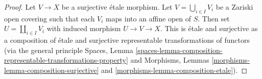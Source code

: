 \documentclass[10pt,a4paper]{amsart}
\theoremstyle{plain}
\theoremstyle{definition}
\theoremstyle{remark}
\numberwithin{equation}{subsection}
\begin{document}
\begin{proof}
Let $V \to X$ be a surjective \'etale morphism.
Let $V = \bigcup_{i \in I} V_i$ be a Zariski open covering
such that each $V_i$ maps into an affine open of $S$.
Then set $U = \coprod_{i \in I} V_i$ with induced morphism
$U \to V \to X$. This is \'etale and surjective as a composition
of \'etale and surjective representable
transformations of functors (via the general principle
Spaces, Lemma
\ref{spaces-lemma-composition-representable-transformations-property}
and
Morphisms, Lemmas \ref{morphisms-lemma-composition-surjective} and
\ref{morphisms-lemma-composition-etale}).
\end{proof}
\end{document}
